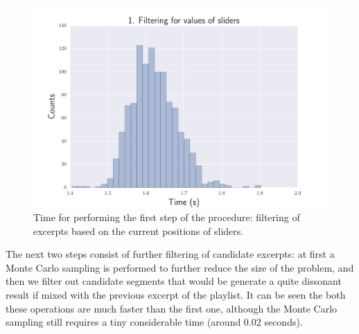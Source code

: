 \begin{figure}[htbp]
\begin{center}
\includegraphics[scale=0.7]{Figures/bench_sliders.pdf}
  \caption[Time for filtering music in regards to sliders' positions]{Time for performing the first step of the procedure: filtering of excerpts based on the current positions of sliders.}
  \label{fig:step1}
\end{center}
\end{figure}

The next two steps consist of further filtering of candidate excerpts: at first a Monte Carlo sampling is performed to further reduce the size of the problem, and then we filter out candidate segments that would be generate a quite dissonant result if mixed with the previous excerpt of the playlist. It can be seen the both these operations are much faster than the first one, although the Monte Carlo sampling still requires a tiny considerable time (around 0.02 seconds). \\ \vspace{5.5cm}

